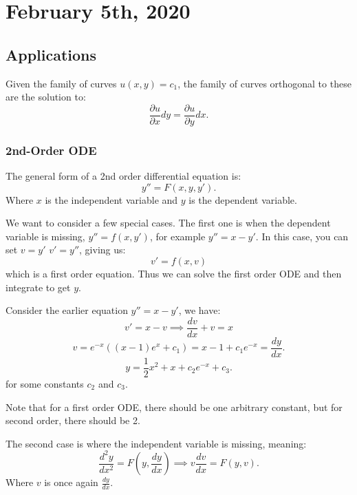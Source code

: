 \documentclass[../main/main.tex]{subfiles}
\begin{document}
\section{February  5th, 2020}
\subsection{Applications}
Given the family of curves $u(x,y) = c_1$, the family of curves orthogonal to these are the solution to: \[
\frac{\partial u}{\partial x} dy = \frac{\partial u}{\partial y} dx
.\] 
\subsubsection{2nd-Order ODE}
\begin{definition}
	The general form of a 2nd order differential equation is: \[
		y'' = F(x,y,y')
	.\] Where $x$ is the independent variable and  $y$ is the dependent variable.
\end{definition}
We want to consider a few special cases. The first one is when the dependent variable is missing, $y''=f(x,y')$, for example  $y''=x-y'$. In this case, you can set  $v=y'$ $v'=y''$, giving us: \[
	v'=f(x,v)
\]  which is a first order equation. Thus we can solve the first order ODE and then integrate to get $y$.
\begin{example}
	Consider the earlier equation $y''=x-y'$, we have: \[
	v' = x-v \implies \frac{dv}{dx}+v = x
	\] \[
	v = e^{-x}((x-1)e^{x}+c_1) = x-1+c_1e^{-x} = \frac{dy}{dx}
	.\] \[
	y = \frac{1}{2}x^2+x+c_2e^{-x}+c_3
	.\] for some constants $c_2$ and $c_3$.
\end{example}
\begin{remark}
	Note that for a first order ODE, there should be one arbitrary constant, but for second order, there should be 2.
\end{remark}
The second case is where the independent variable is missing, meaning: \[
	\frac{d^2y}{dx^2} = F(y,\frac{dy}{dx}) \implies v \frac{dv}{dx} = F(y,v)
.\] Where $v$ is once again $\frac{dy}{dx}$.
\end{document}
